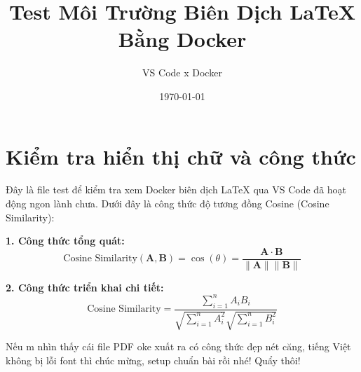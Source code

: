 \documentclass[12pt, a4paper]{article}
\begin{document}
\title{Test Môi Trường Biên Dịch LaTeX Bằng Docker}
\author{VS Code x Docker}
\date{\today}
\maketitle

\section{Kiểm tra hiển thị chữ và công thức}
Đây là file test để kiểm tra xem Docker biên dịch LaTeX qua VS Code đã hoạt động ngon lành chưa. Dưới đây là công thức độ tương đồng Cosine (Cosine Similarity):

\textbf{1. Công thức tổng quát:}
$$
\text{Cosine Similarity}(\mathbf{A}, \mathbf{B}) = \cos(\theta) = \frac{\mathbf{A} \cdot \mathbf{B}}{\|\mathbf{A}\| \|\mathbf{B}\|}
$$

\textbf{2. Công thức triển khai chi tiết:}
$$
\text{Cosine Similarity} = \frac{\sum_{i=1}^{n} A_i B_i}{\sqrt{\sum_{i=1}^{n} A_i^2} \sqrt{\sum_{i=1}^{n} B_i^2}}
$$

Nếu m nhìn thấy cái file PDF oke xuất ra có công thức đẹp nét căng, tiếng Việt không bị lỗi font thì chúc mừng, setup chuẩn bài rồi nhé! Quẩy thôi!
\end{document}
